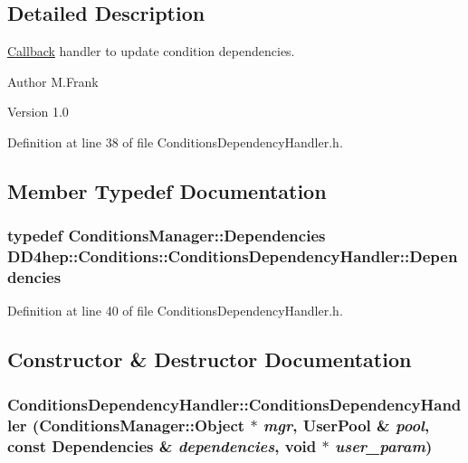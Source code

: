 \subsection{Detailed Description}
\hyperlink{class_d_d4hep_1_1_callback}{Callback} handler to update condition dependencies. \begin{DoxyAuthor}{Author}
M.Frank 
\end{DoxyAuthor}
\begin{DoxyVersion}{Version}
1.0 
\end{DoxyVersion}


Definition at line 38 of file ConditionsDependencyHandler.h.

\subsection{Member Typedef Documentation}
\hypertarget{class_d_d4hep_1_1_conditions_1_1_conditions_dependency_handler_a4a063b30ffccb0e30f3302f1537aef10}{
\subsubsection[{Dependencies}]{\setlength{\rightskip}{0pt plus 5cm}typedef {\bf ConditionsManager::Dependencies} {\bf DD4hep::Conditions::ConditionsDependencyHandler::Dependencies}}}
\label{class_d_d4hep_1_1_conditions_1_1_conditions_dependency_handler_a4a063b30ffccb0e30f3302f1537aef10}


Definition at line 40 of file ConditionsDependencyHandler.h.

\subsection{Constructor \& Destructor Documentation}
\hypertarget{class_d_d4hep_1_1_conditions_1_1_conditions_dependency_handler_a955647ff8dc9227dc10953d9accf2d62}{
\subsubsection[{ConditionsDependencyHandler}]{\setlength{\rightskip}{0pt plus 5cm}ConditionsDependencyHandler::ConditionsDependencyHandler ({\bf ConditionsManager::Object} $\ast$ {\em mgr}, \/  {\bf UserPool} \& {\em pool}, \/  const {\bf Dependencies} \& {\em dependencies}, \/  void $\ast$ {\em user\_\-param})}}
\label{class_d_d4hep_1_1_conditions_1_1_conditions_dependency_handler_a955647ff8dc9227dc10953d9accf2d62}


